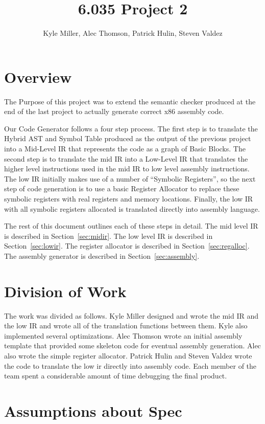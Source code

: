 \documentclass[11pt]{article}
\title{6.035 Project 2}
\author{Kyle Miller, Alec Thomson, Patrick Hulin, Steven Valdez}
\begin{document}
 
\maketitle

\section {Overview}

The Purpose of this project was to extend the semantic checker
produced at the end of the last project to actually generate correct
x86 assembly code. 

Our Code Generator follows a four step process. The first step is to
translate the Hybrid AST and Symbol Table produced as the output of
the previous project into a Mid-Level IR that represents the code as a
graph of Basic Blocks. The second step is to translate the mid IR into
a Low-Level IR that translates the higher level instructions used in
the mid IR to low level assembly instructions. The low IR initially
makes use of a number of ``Symbolic Registers'', so the next step of
code generation is to use a basic Register Allocator to replace these
symbolic registers with real registers and memory locations. Finally,
the low IR with all symbolic registers allocated is translated
directly into assembly language. 

The rest of this document outlines each of these steps in detail. The
mid level IR is described in Section~\ref{sec:midir}. The low level IR
is described in Section~\ref{sec:lowir}. The register allocator is
described in Section~\ref{sec:regalloc}. The assembly generator is
described in Section~\ref{sec:assembly}. 

\section{Division of Work} 
\label{sec:division}

The work was divided as follows. Kyle Miller designed and wrote the
mid IR and the low IR and wrote all of the translation functions
between them. Kyle also implemented several optimizations. Alec
Thomson wrote an initial assembly template that provided some skeleton
code for eventual assembly generation. Alec also wrote the simple
register allocator. Patrick Hulin and Steven Valdez wrote the code to translate the
low ir directly into assembly code. Each member of the team spent a
considerable amount of time debugging the final product. 

\section{Assumptions about Spec} 
\label{sec:assumptions}
\end{document}
